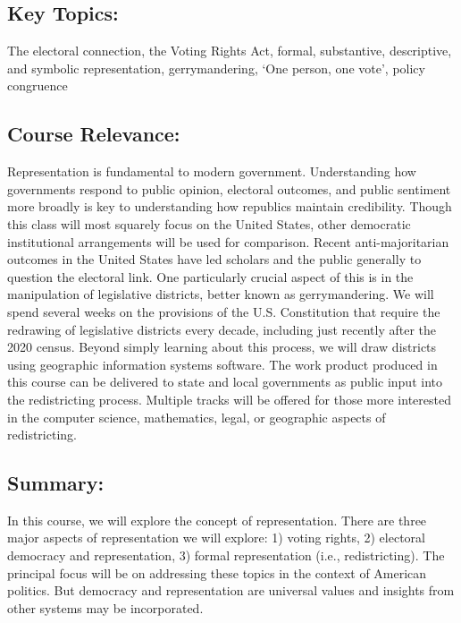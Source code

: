 \documentclass[
]{article}
\begin{document}
\hypertarget{key-topics}{%
\subsection{Key Topics:}\label{key-topics}}

The electoral connection, the Voting Rights Act, formal, substantive,
descriptive, and symbolic representation, gerrymandering, `One person,
one vote', policy congruence

\hypertarget{course-relevance}{%
\subsection{Course Relevance:}\label{course-relevance}}

Representation is fundamental to modern government. Understanding how
governments respond to public opinion, electoral outcomes, and public
sentiment more broadly is key to understanding how republics maintain
credibility. Though this class will most squarely focus on the United
States, other democratic institutional arrangements will be used for
comparison. Recent anti-majoritarian outcomes in the United States have
led scholars and the public generally to question the electoral link.
One particularly crucial aspect of this is in the manipulation of
legislative districts, better known as gerrymandering. We will spend
several weeks on the provisions of the U.S. Constitution that require
the redrawing of legislative districts every decade, including just
recently after the 2020 census. Beyond simply learning about this
process, we will draw districts using geographic information systems
software. The work product produced in this course can be delivered to
state and local governments as public input into the redistricting
process. Multiple tracks will be offered for those more interested in
the computer science, mathematics, legal, or geographic aspects of
redistricting.

\hypertarget{summary}{%
\subsection{Summary:}\label{summary}}

In this course, we will explore the concept of representation. There are
three major aspects of representation we will explore: 1) voting rights,
2) electoral democracy and representation, 3) formal representation
(i.e., redistricting). The principal focus will be on addressing these
topics in the context of American politics. But democracy and
representation are universal values and insights from other systems may
be incorporated.
\end{document}
